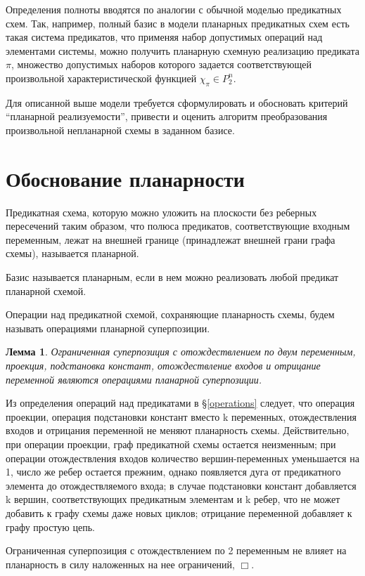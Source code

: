 \documentclass[12pt]{extarticle}
\newtheorem{lemma}[theorem]{Лемма}
\newenvironment{proof}[1][Доказательство.]{\begin{trivlist}
\item[\hskip \labelsep {\bfseries #1}]}{\end{trivlist}}
\newenvironment{definition}[1][Определение.]{\begin{trivlist}
\item[\hskip \labelsep {\bfseries #1}]}{\end{trivlist}}
\begin{document}
Определения полноты вводятся по аналогии с обычной моделью предикатных схем. Так, например, полный базис
в модели планарных предикатных схем есть такая система предикатов, что 
применяя набор допустимых
операций над элементами системы, можно получить планарную схемную реализацию предиката $\pi$, множество
допустимых наборов которого задается соответствующей произвольной характеристической функцией $\chi_{\pi} \in P_2^n$. 

Для описанной выше модели требуется сформулировать и обосновать критерий ``планарной реализуемости'', привести и оценить алгоритм
преобразования произвольной непланарной схемы в заданном базисе.
\clearpage

\section{Обоснование планарности}

\begin{definition}
Предикатная схема, которую можно уложить на плоскости без реберных пересечений таким образом, что полюса предикатов, 
соответствующие входным переменным, лежат на внешней границе (принадлежат внешней грани графа схемы), называется планарной. 
\end{definition}

\begin{definition}
Базис называется планарным, если в нем можно реализовать любой предикат планарной схемой.
\end{definition}

\begin{definition}
Операции над предикатной схемой, сохраняющие планарность схемы, будем называть операциями планарной суперпозиции.
\end{definition}

\begin{lemma}
\label{lemma_planar_ops}
Ограниченная суперпозиция с отождествлением по двум переменным, проекция,
подстановка констант, отождествление входов и отрицание переменной являются операциями планарной суперпозиции.
\end{lemma}
\begin{proof}
Из определения операций над предикатами в \S \ref{operations} следует, что операция проекции, операция подстановки
констант вместо k переменных, отождествления входов и отрицания переменной не меняют планарность схемы. 
Действительно, при операции проекции, граф предикатной схемы остается неизменным; 
при операции отождествления входов количество вершин-переменных уменьшается на 1, число же ребер остается прежним, 
однако появляется дуга от предикатного элемента до отождествляемого входа;
в случае подстановки констант добавляется k вершин, соответствующих предикатным элементам
и k ребер, что не может добавить к графу схемы даже новых циклов;
отрицание переменной добавляет к графу простую цепь. 

Ограниченная суперпозиция с отождествлением по 2 переменным не влияет на планарность в силу наложенных на
нее ограничений, 
$\Box$.
\end{proof}
\end{document}
